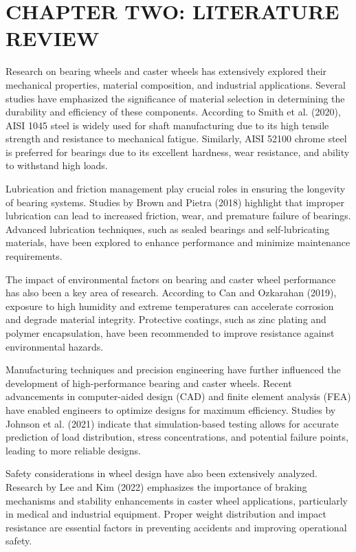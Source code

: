 \documentclass[../../main]{subfiles}
\begin{document}
\section{CHAPTER TWO: LITERATURE
REVIEW}\label{chapter-two-literature-review}

Research on bearing wheels and caster wheels has extensively explored
their mechanical properties, material composition, and industrial
applications. Several studies have emphasized the significance of
material selection in determining the durability and efficiency of these
components. According to Smith et al. (2020), AISI 1045 steel is widely
used for shaft manufacturing due to its high tensile strength and
resistance to mechanical fatigue. Similarly, AISI 52100 chrome steel is
preferred for bearings due to its excellent hardness, wear resistance,
and ability to withstand high loads.

Lubrication and friction management play crucial roles in ensuring the
longevity of bearing systems. Studies by Brown and Pietra (2018)
highlight that improper lubrication can lead to increased friction,
wear, and premature failure of bearings. Advanced lubrication
techniques, such as sealed bearings and self-lubricating materials, have
been explored to enhance performance and minimize maintenance
requirements.

The impact of environmental factors on bearing and caster wheel
performance has also been a key area of research. According to Can and
Ozkarahan (2019), exposure to high humidity and extreme temperatures can
accelerate corrosion and degrade material integrity. Protective
coatings, such as zinc plating and polymer encapsulation, have been
recommended to improve resistance against environmental hazards.

Manufacturing techniques and precision engineering have further
influenced the development of high-performance bearing and caster
wheels. Recent advancements in computer-aided design (CAD) and finite
element analysis (FEA) have enabled engineers to optimize designs for
maximum efficiency. Studies by Johnson et al. (2021) indicate that
simulation-based testing allows for accurate prediction of load
distribution, stress concentrations, and potential failure points,
leading to more reliable designs.

Safety considerations in wheel design have also been extensively
analyzed. Research by Lee and Kim (2022) emphasizes the importance of
braking mechanisms and stability enhancements in caster wheel
applications, particularly in medical and industrial equipment. Proper
weight distribution and impact resistance are essential factors in
preventing accidents and improving operational safety.
\end{document}
